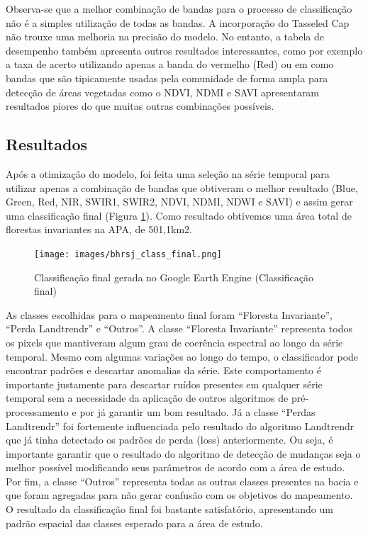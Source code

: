 \documentclass[12pt,a4paper]{article}
\begin{document}
Observa-se que a melhor combinação de bandas para o processo de classificação não é a simples utilização de todas as bandas. A incorporação do Tasseled Cap não trouxe uma melhoria na precisão do modelo. No entanto, a tabela de desempenho também apresenta outros resultados interessantes, como por exemplo a taxa de acerto utilizando apenas a banda do vermelho (Red) ou em como bandas que são tipicamente usadas pela comunidade de forma ampla para detecção de áreas vegetadas como o NDVI, NDMI e SAVI apresentaram resultados piores do que muitas outras combinações possíveis. 

\subsection{Resultados}

\hspace{13pt} Após a otimização do modelo, foi feita uma seleção na série temporal para utilizar apenas a combinação de bandas que obtiveram o melhor resultado (Blue, Green, Red, NIR, SWIR1, SWIR2, NDVI, NDMI, NDWI e SAVI) e assim gerar uma classificação final (Figura \ref{fig:bhrsj_class_final}). Como resultado obtivemos uma área total de florestas invariantes na APA, de 501,1km2.

\begin{figure}[h!]
    \centering
    \texttt{[image: images/bhrsj\_class\_final.png]}
    \caption{Classificação final gerada no Google Earth Engine (Classificação final)}
    \label{fig:bhrsj_class_final}
\end{figure}

\newpage

As classes escolhidas para o mapeamento final foram “Floresta Invariante”, “Perda Landtrendr” e “Outros”. A classe “Floresta Invariante” representa todos os pixels que mantiveram algum grau de coerência espectral ao longo da série temporal. Mesmo com algumas variações ao longo do tempo, o classificador pode encontrar padrões e descartar anomalias da série. Este comportamento é importante justamente para descartar ruídos presentes em qualquer série temporal sem a necessidade da aplicação de outros algoritmos de pré-processamento e por já garantir um bom resultado. Já a classe “Perdas Landtrendr” foi fortemente influenciada pelo resultado do algoritmo Landtrendr que já tinha detectado os padrões de perda (loss) anteriormente. Ou seja, é importante garantir que o resultado do algoritmo de detecção de mudanças seja o melhor possível modificando seus parâmetros de acordo com a área de estudo. Por fim, a classe “Outros” representa todas as outras classes presentes na bacia e que foram agregadas para não gerar confusão com os objetivos do mapeamento. O resultado da classificação final foi bastante satisfatório, apresentando um padrão espacial das classes esperado para a área de estudo.
\end{document}

